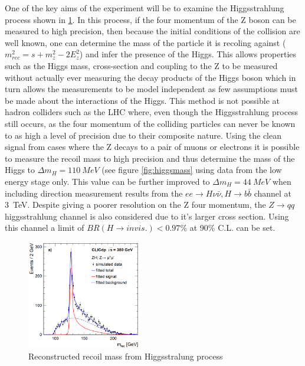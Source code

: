 One of the key aims of the experiment will be to examine the Higgsstrahlung process shown in \ref{fig:higgsstrahlung}. In this process, if the four momentum of the Z boson can be measured to high precision, then because the initial conditions of the collision are well known, one can determine the mass of the particle it is recoling against ($m_{rec}^{2} = s + m_{z}^{2} - 2E_{z}^{2}$) and infer the presence of the Higgs. This allows properties such as the Higgs mass, cross-section and coupling to the Z to be measured without actually ever measuring the decay products of the Higgs boson which in turn allows the measurements to be model independent as few assumptions must be made about the interactions of the Higgs. This method is not possible at hadron colliders such as the LHC where, even though the Higgsstrahlung process still occurs, as the four momentum of the colliding particles can never be known to as high a level of precision due to their composite nature. Using the clean signal from cases where the Z decays to a pair of muons or electrons it is possible to measure the recoil mass to high precision and thus determine the mass of the Higgs to $\Delta m_{H} = 110~MeV$ (see figure \ref{fig:higgsmass} using data from the low energy stage only. This value can be further improved to $\Delta m_{H} = 44~MeV$ when including direction measurement results from the $ee\rightarrow H\nu\bar{\nu}, H\rightarrow b\bar{b}$ channel at 3~TeV. Despite giving a poorer resolution on the Z four momentum, the $Z\rightarrow qq$ higgsstrahlung channel is also considered due to it's larger cross section. Using this channel a limit of $BR(H\rightarrow invis.) <0.97\%$ at 90\% C.L. can be set. 

\begin{figure}
  \centering
  \includegraphics[width=0.45\textwidth,keepaspectratio]{Theory/fig/HiggsRecoilMass.png}
  \caption[Reconstructed recoil mass from Higgsstralung process]{Reconstructed recoil mass from Higgsstralung process}
  \label{fig:higgsstrahlung}
\end{figure}


